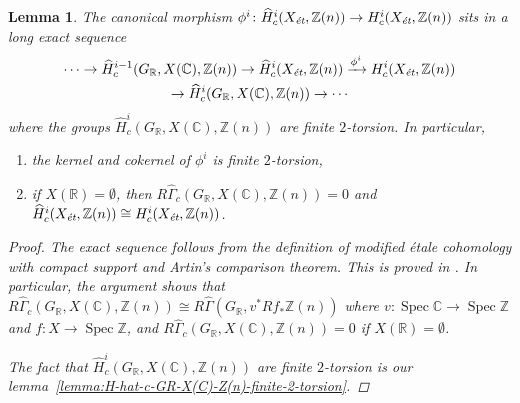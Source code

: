 \documentclass[leqno,12pt]{article}
\theoremstyle{plain}
\newtheorem{lemma}[theorem]{\indent\sc Lemma}
\theoremstyle{definition}
\DeclareMathOperator{\Spec}{Spec}
\newcommand{\ZZ}{\mathbb{Z}}
\newcommand{\RR}{\mathbb{R}}
\newcommand{\CC}{\mathbb{C}}
\newcommand{\et}{\text{\it \'{e}t}}
\begin{document}
\begin{lemma}
  \label{lemma:morphism-hat-Hc(Xet,Z(n))->Hc(Xet,Z(n))}
  The canonical morphism
  $\phi^i\colon \widehat{H}^i_c (X_\et, \ZZ (n)) \to H^i_c (X_\et, \ZZ (n))$
  sits in a long exact sequence
  \begin{multline*}
    \cdots \to \widehat{H}^{i-1}_c (G_\RR, X (\CC), \ZZ (n)) \to
    \widehat{H}_c^i (X_\et, \ZZ(n)) \xrightarrow{\phi^i}
    H_c^i (X_\et, \ZZ(n)) \\
    \to \widehat{H}^i_c (G_\RR, X (\CC), \ZZ (n)) \to \cdots
  \end{multline*}
  where the groups $\widehat{H}^i_c (G_\RR, X (\CC), \ZZ
  (n))$ are finite $2$-torsion. In particular,
  \begin{enumerate}
  \item[$1)$] the kernel and cokernel of $\phi^i$ is finite $2$-torsion,

  \item[$2)$] if $X (\RR) = \emptyset$, then
    $R\widehat{\Gamma}_c (G_\RR, X (\CC), \ZZ (n)) = 0$ and
    $\widehat{H}^i_c (X_\et, \ZZ (n)) \cong H^i_c (X_\et, \ZZ (n))$.
  \end{enumerate}

  \begin{proof}
    The exact sequence follows from the definition of modified \'{e}tale cohomology
    with compact support and Artin's comparison theorem. This is proved in
    \cite[Lemma~6.14]{Flach-Morin-2018}. In particular, the argument shows that
    $R\widehat{\Gamma}_c (G_\RR, X (\CC), \ZZ (n)) \cong
    R\widehat{\Gamma} (G_\RR, v^* Rf_* \ZZ(n))$ where
    $v\colon \Spec \CC \to \Spec \ZZ$ and $f\colon X\to \Spec \ZZ$,
    and $R\widehat{\Gamma}_c (G_\RR, X (\CC), \ZZ (n)) = 0$ if
    $X (\RR) = \emptyset$.

    The fact that $\widehat{H}^i_c (G_\RR, X (\CC), \ZZ (n))$ are finite
    $2$-torsion is our lemma~\ref{lemma:H-hat-c-GR-X(C)-Z(n)-finite-2-torsion}.
  \end{proof}
\end{lemma}
\end{document}
